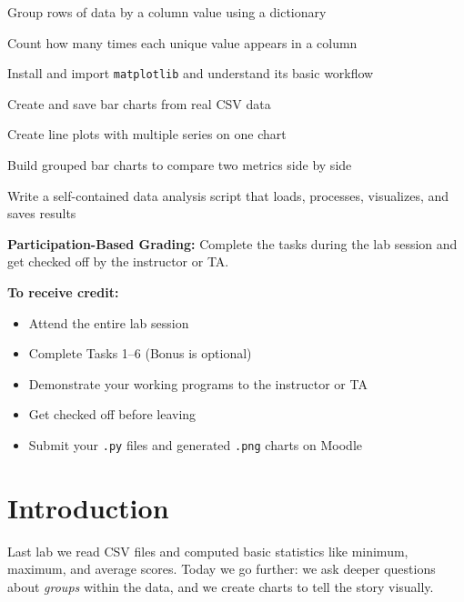 \documentclass{cslab}
\begin{document}
\maketitle

\begin{objectives}
    \item Group rows of data by a column value using a dictionary
    \item Count how many times each unique value appears in a column
    \item Install and import \texttt{matplotlib} and understand its basic workflow
    \item Create and save bar charts from real CSV data
    \item Create line plots with multiple series on one chart
    \item Build grouped bar charts to compare two metrics side by side
    \item Write a self-contained data analysis script that loads, processes, visualizes, and saves results
\end{objectives}

\begin{grading}
\textbf{Participation-Based Grading:} Complete the tasks during the lab session and get checked off by the instructor or TA.

\textbf{To receive credit:}
\begin{itemize}
    \item Attend the entire lab session
    \item Complete Tasks 1--6 (Bonus is optional)
    \item Demonstrate your working programs to the instructor or TA
    \item Get checked off before leaving
    \item Submit your \texttt{.py} files and generated \texttt{.png} charts on Moodle
\end{itemize}
\end{grading}

\section{Introduction}

Last lab we read CSV files and computed basic statistics like minimum, maximum, and average scores. Today we go further: we ask deeper questions about \emph{groups} within the data, and we create charts to tell the story visually.
\end{document}
